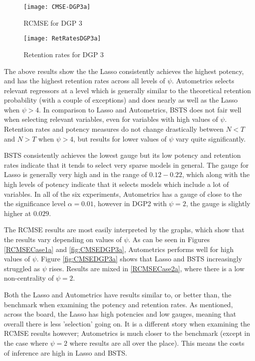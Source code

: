 \documentclass[11pt, oneside]{book}   	%
\begin{document}
\begin{figure}[h]

\begin{minipage}{.5\textwidth}
\centering
\texttt{[image: CMSE-DGP3a]}
\caption{RCMSE for DGP 3}
\label{fig:CMSEDGP3a}
\end{minipage}%
\begin{minipage}{.5\textwidth}
\centering
\texttt{[image: RetRatesDGP3a]}
\caption{Retention rates for DGP 3}
\label{fig:RetRatesDGP3a}

\end{minipage}

\end{figure}

\clearpage

The above results show the the Lasso consistently achieves the highest potency, and has the highest retention rates across all levels of $\psi$. Autometrics selects relevant regressors at a level which is generally similar to the theoretical retention probability (with a couple of exceptions) and does nearly as well as the Lasso when $\psi>4$. In comparison to Lasso and Autometrics, BSTS does not fair well when selecting relevant variables, even for variables with high values of $\psi$. Retention rates and potency measures do not change drastically between $N<T$ and $N>T$ when $\psi>4$, but results for lower values of $\psi$ vary quite significantly. 

BSTS consistently achieves the lowest gauge but its low potency and retention rates indicate that it tends to select very sparse models in general. The gauge for Lasso is generally very high and in the range of $0.12-0.22$, which along with the high levels of potency indicate that it selects models which include a lot of variables. In all of the six experiments, Autometrics has a gauge of close to the the significance level $\alpha = 0.01$, however in DGP2 with $\psi = 2$, the gauge is slightly higher at $0.029$. 

The RCMSE results are most easily interpreted by the graphs, which show that the results vary depending on values of $\psi$. As can be seen in Figures \ref{RCMSECase1a} and \ref{fig:CMSEDGP3a}, Autometrics performs well for high values of $\psi$. Figure \ref{fig:CMSEDGP3a} shows that Lasso and BSTS increasingly struggled as $\psi$ rises. Results are mixed in \ref{RCMSECase2a}, where there is a low non-centrality of $\psi=2$.

Both the Lasso and Autometrics have results similar to, or better than, the benchmark when examining the potency and retention rates. As mentioned, across the board, the Lasso has high potencies and low gauges, meaning that overall there is less 'selection' going on. It is a different story when examining the RCMSE results however; Autometrics is much closer to the benchmark (except in the case where $\psi=2$ where results are all over the place). This means the costs of inference are high in Lasso and BSTS.
\end{document}
